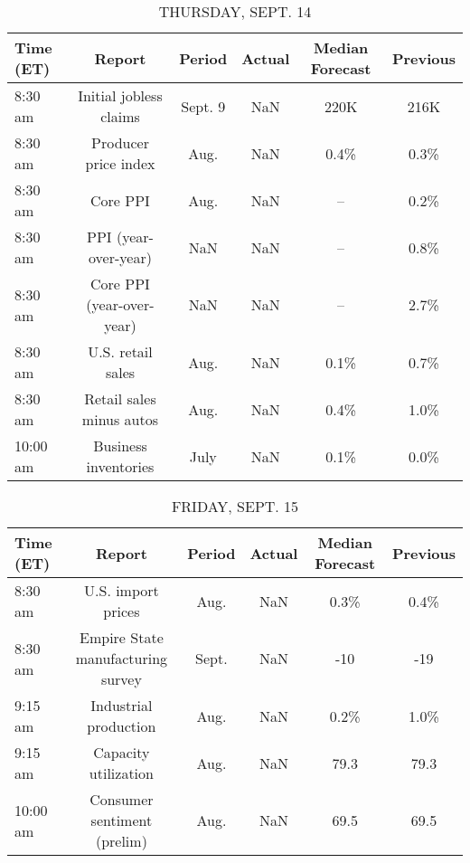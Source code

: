 \documentclass{article}%
\begin{document}
%


\begin{table}[htbp]%
\caption{THURSDAY, SEPT. 14}%
\centering%
\begin{adjustbox}{width=1\textwidth}%
\begin{tabular}{lccccc}
\toprule
Time (ET) &                    Report &  Period & Actual & Median Forecast & Previous \\
\midrule
  8:30 am &    Initial jobless claims & Sept. 9 &    NaN &            220K &     216K \\
  8:30 am &      Producer price index &    Aug. &    NaN &            0.4\% &     0.3\% \\
  8:30 am &                  Core PPI &    Aug. &    NaN &              -- &     0.2\% \\
  8:30 am &      PPI (year-over-year) &     NaN &    NaN &              -- &     0.8\% \\
  8:30 am & Core PPI (year-over-year) &     NaN &    NaN &              -- &     2.7\% \\
  8:30 am &         U.S. retail sales &    Aug. &    NaN &            0.1\% &     0.7\% \\
  8:30 am &  Retail sales minus autos &    Aug. &    NaN &            0.4\% &     1.0\% \\
 10:00 am &      Business inventories &    July &    NaN &            0.1\% &     0.0\% \\
\bottomrule
\end{tabular}
%
\end{adjustbox}%
\end{table}

%


\begin{table}[htbp]%
\caption{FRIDAY, SEPT. 15}%
\centering%
\begin{adjustbox}{width=1\textwidth}%
\begin{tabular}{lccccc}
\toprule
Time (ET) &                            Report & Period & Actual & Median Forecast & Previous \\
\midrule
  8:30 am &                U.S. import prices &   Aug. &    NaN &            0.3\% &     0.4\% \\
  8:30 am & Empire State manufacturing survey &  Sept. &    NaN &             -10 &      -19 \\
  9:15 am &             Industrial production &   Aug. &    NaN &            0.2\% &     1.0\% \\
  9:15 am &              Capacity utilization &   Aug. &    NaN &            79.3 &     79.3 \\
 10:00 am &       Consumer sentiment (prelim) &   Aug. &    NaN &            69.5 &     69.5 \\
\bottomrule
\end{tabular}
%
\end{adjustbox}%
\end{table}
\end{document}
